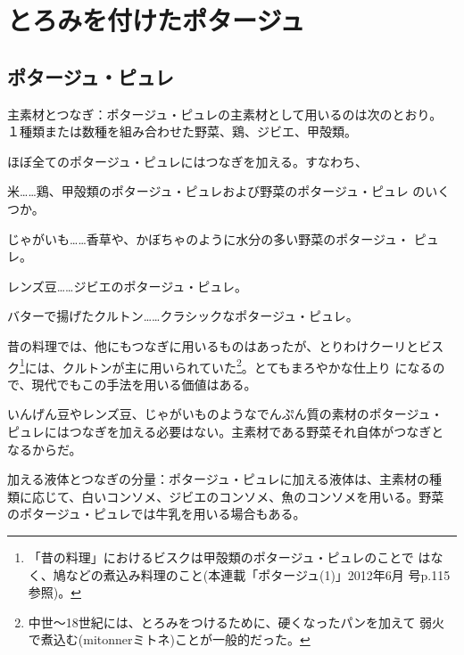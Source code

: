 \href{原稿下準備20180414五島、連載からコピー}{} \href{訳と注釈}{}
\href{未、原文対照チェック}{} \href{未、日本語表現校正}{}
\href{未、その他修正}{} \href{未、原稿最終校正}{}

\hypertarget{ux3068ux308dux307fux3092ux4ed8ux3051ux305fux30ddux30bfux30fcux30b8ux30e5}{%
\section{とろみを付けたポタージュ}\label{ux3068ux308dux307fux3092ux4ed8ux3051ux305fux30ddux30bfux30fcux30b8ux30e5}}


\hypertarget{ux30ddux30bfux30fcux30b8ux30e5ux30d4ux30e5ux30ec}{%
\subsection{ポタージュ・ピュレ}\label{ux30ddux30bfux30fcux30b8ux30e5ux30d4ux30e5ux30ec}}


主素材とつなぎ：ポタージュ・ピュレの主素材として用いるのは次のとおり。
１種類または数種を組み合わせた野菜、鶏、ジビエ、甲殻類。

ほぼ全てのポタージュ・ピュレにはつなぎを加える。すなわち、

米\ldots{}\ldots{}鶏、甲殻類のポタージュ・ピュレおよび野菜のポタージュ・ピュレ
のいくつか。

じゃがいも\ldots{}\ldots{}香草や、かぼちゃのように水分の多い野菜のポタージュ・
ピュレ。

レンズ豆\ldots{}\ldots{}ジビエのポタージュ・ピュレ。

バターで揚げたクルトン\ldots{}\ldots{}クラシックなポタージュ・ピュレ。

昔の料理では、他にもつなぎに用いるものはあったが、とりわけクーリとビス
ク\footnote{「昔の料理」におけるビスクは甲殻類のポタージュ・ピュレのことで
  はなく、鳩などの煮込み料理のこと(本連載「ポタージュ(1)」2012年6月
  号p.115 参照)。}には、クルトンが主に用いられていた\footnote{中世〜18世紀には、とろみをつけるために、硬くなったパンを加えて
  弱火で煮込む(mitonnerミトネ)ことが一般的だった。}。とてもまろやかな仕上り
になるので、現代でもこの手法を用いる価値はある。

いんげん豆やレンズ豆、じゃがいものようなでんぷん質の素材のポタージュ・
ピュレにはつなぎを加える必要はない。主素材である野菜それ自体がつなぎと
なるからだ。

加える液体とつなぎの分量：ポタージュ・ピュレに加える液体は、主素材の種
類に応じて、白いコンソメ、ジビエのコンソメ、魚のコンソメを用いる。野菜
のポタージュ・ピュレでは牛乳を用いる場合もある。

